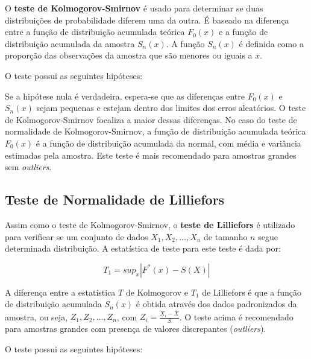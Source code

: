 \documentclass[
]{estat/estat}
\begin{document}
O \textbf{teste de Kolmogorov-Smirnov} é usado para determinar se duas
distribuições de probabilidade diferem uma da outra. É baseado na
diferença entre a função de distribuição acumulada teórica \(F_0(x)\) e
a função de distribuição acumulada da amostra \(S_n(x)\). A função
\(S_n(x)\) é definida como a proporção das observações da amostra que
são menores ou iguais a \(x\).

O teste possui as seguintes hipóteses:

\begin{center}
\end{center}

Se a hipótese nula é verdadeira, espera-se que as diferenças entre
\(F_0(x)\) e \(S_n(x)\) sejam pequenas e estejam dentro dos limites dos
erros aleatórios. O teste de Kolmogorov-Smirnov focaliza a maior dessas
diferenças. No caso do teste de normalidade de Kolmogorov-Smirnov, a
função de distribuição acumulada teórica \(F_0(x)\) é a função de
distribuição acumulada da normal, com média e variância estimadas pela
amostra. Este teste é mais recomendado para amostras grandes sem
\emph{outliers}.

\subsection{Teste de Normalidade de
Lilliefors}\label{teste-de-normalidade-de-lilliefors}

Assim como o teste de Kolmogorov-Smirnov, o \textbf{teste de Lilliefors}
é utilizado para verificar se um conjunto de dados
\(X_1, X_2, ..., X_n\) de tamanho \(n\) segue determinada distribuição.
A estatística de teste para este teste é dada por:

\[ T_1 = sup_x |F^*(x) - S(X)| \]

A diferença entre a estatística \(T\) de Kolmogorov e \(T_1\) de
Lilliefors é que a função de distribuição acumulada \(S_n(x)\) é obtida
através dos dados padronizados da amostra, ou seja,
\(Z_1, Z_2, ..., Z_n\), com
\(Z_i = \displaystyle \frac{X_i - \bar{X}}{S}\). O teste acima é
recomendado para amostras grandes com presença de valores discrepantes
(\emph{outliers}).

O teste possui as seguintes hipóteses:

\begin{center}
\end{center}
\end{document}
